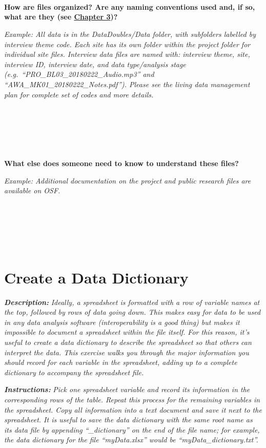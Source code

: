 \documentclass[
]{book}
\begin{document}
~

~

~

\textbf{How are files organized? Are any naming conventions used and, if so, what are they (see \protect\hyperlink{file-organization-and-naming}{Chapter 3})?}

\emph{Example: All data is in the DataDoubles/Data folder, with subfolders labelled by interview theme code. Each site has its own folder within the project folder for individual site files. Interview data files are named with: interview theme, site, interview ID, interview date, and data type/analysis stage (e.g.~``PRO\_BL03\_20180222\_Audio.mp3'' and ``AWA\_MK01\_20180222\_Notes.pdf''). Please see the living data management plan for complete set of codes and more details.}

~

~

~

\textbf{What else does someone need to know to understand these files?}

\emph{Example: Additional documentation on the project and public research files are available on OSF.}

~

~

~

\newpage

\hypertarget{data-dictionary}{%
\section{Create a Data Dictionary}\label{data-dictionary}}

\textbf{\emph{Description:}} \emph{Ideally, a spreadsheet is formatted with a row of variable names at the top, followed by rows of data going down. This makes easy for data to be used in any data analysis software (interoperability is a good thing) but makes it impossible to document a spreadsheet within the file itself. For this reason, it's useful to create a data dictionary to describe the spreadsheet so that others can interpret the data. This exercise walks you through the major information you should record for each variable in the spreadsheet, adding up to a complete dictionary to accompany the spreadsheet file.}

\textbf{\emph{Instructions:}} \emph{Pick one spreadsheet variable and record its information in the corresponding rows of the table. Repeat this process for the remaining variables in the spreadsheet. Copy all information into a text document and save it next to the spreadsheet. It is useful to save the data dictionary with the same root name as its data file by appending ``\_dictionary'' on the end of the file name; for example, the data dictionary for the file ``myData.xlsx'' would be ``myData\_dictionary.txt''.}
\end{document}
